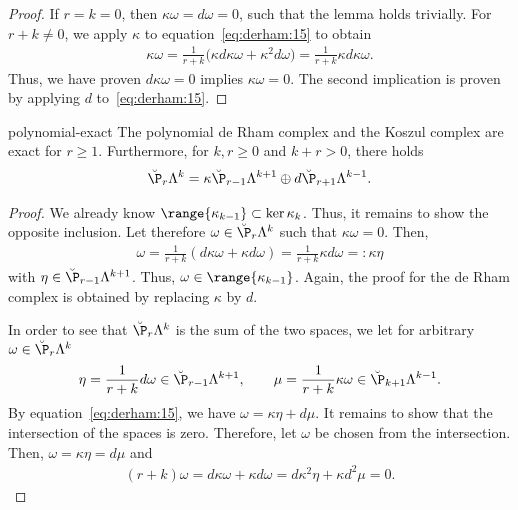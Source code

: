 \begin{proof}
  If $r=k=0$, then $\kappa\omega = d\omega = 0$, such that the lemma
  holds trivially. For $r+k\neq 0$, we apply $\kappa$ to
  equation~\eqref{eq:derham:15} to obtain
  \begin{gather}
    \kappa\omega = \frac1{r+k}
    \bigl(\kappa d\kappa\omega + \kappa^2d\omega\bigr)
    = \frac1{r+k}\kappa d\kappa\omega.
  \end{gather}
  Thus, we have proven $d\kappa\omega=0$ implies $\kappa\omega=0$. The
  second implication is proven by applying $d$ to~\eqref{eq:derham:15}.
\end{proof}

\begin{Theorem}{polynomial-exact}
  The polynomial de Rham complex and the Koszul complex are exact for
  $r\ge 1$. Furthermore, for $k,r\ge 0$ and $k+r>0$, there holds
  \begin{gather}
    \label{eq:derham:17}
    \breve \P_r\Lambda^k = \kappa \breve\P_{r-1}\Lambda^{k+1}
    \oplus d\breve\P_{r+1}\Lambda^{k-1}.
  \end{gather}
\end{Theorem}

\begin{proof}
  We already know $\range{\kappa_{k-1}} \subset \ker{\kappa_k}$. Thus,
  it remains to show the opposite inclusion. Let therefore $\omega\in
  \breve \P_r\Lambda^k$ such that $\kappa\omega=0$. Then,
  \begin{gather}
    \omega = \frac1{r+k} (d\kappa\omega+\kappa d\omega)
    = \frac1{r+k} \kappa d\omega =: \kappa\eta
  \end{gather}
  with $\eta \in \breve\P_{r-1}\Lambda^{k+1}$. Thus,
  $\omega\in \range{\kappa_{k-1}}$. Again, the proof for the de Rham
  complex is obtained by replacing $\kappa$ by $d$.

  In order to see that $\breve \P_r\Lambda^k$ is the sum of the two
  spaces, we let for arbitrary $\omega\in \breve \P_r\Lambda^k$
  \begin{gather}
    \eta = \frac1{r+k} d\omega \in \breve\P_{r-1}\Lambda^{k+1},
    \qquad
    \mu = \frac1{r+k} \kappa\omega \in \breve\P_{k+1}\Lambda^{k-1}.
  \end{gather}
  By equation~\eqref{eq:derham:15}, we have
  $\omega = \kappa\eta + d\mu$. It remains to show that the
  intersection of the spaces is zero. Therefore, let $\omega$ be
  chosen from the intersection. Then, $\omega = \kappa\eta = d \mu$
  and
  \begin{gather}
    (r+k)\omega = d\kappa \omega + \kappa d \omega
    = d \kappa^2 \eta + \kappa d^2 \mu = 0.
  \end{gather}
\end{proof}

